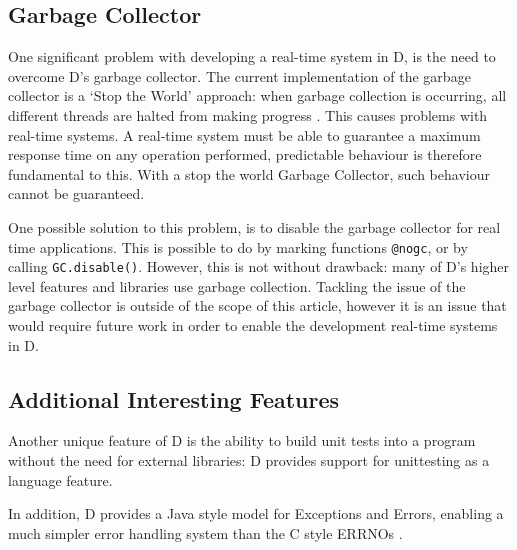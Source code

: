 \subsection{Garbage Collector}
One significant problem with developing a real-time system in D, is the need to 
overcome D's garbage collector. The current implementation of the garbage 
collector is a `Stop the World' approach: when garbage collection is occurring, 
all different threads are halted from making progress 
\cite{http://dlang.org/garbage.html}. This causes problems with 
real-time systems. A real-time system must be able to guarantee a maximum response 
time on any operation performed, predictable behaviour is therefore fundamental to this. 
With a stop the world Garbage Collector, such behaviour cannot be guaranteed. 
\par\bigskip\noindent
One possible solution to this problem, is to disable the garbage collector for 
real time applications. This is possible to do by marking functions \texttt{@nogc}, 
or by calling \texttt{GC.disable()}. However, this is not without drawback: 
many of D's higher level features and libraries use garbage collection. 
Tackling the issue of the garbage collector is outside of the scope of this 
article, however it is an issue that would require future work in order to 
enable the development real-time systems in D. 

\subsection{Additional Interesting Features}
Another unique feature of D is the ability to build unit tests into a 
program without the need for external libraries: D provides support for 
unittesting as a language feature. 
\par\bigskip\noindent
In addition, D provides a Java style model for Exceptions and Errors, enabling 
a much simpler error handling system than the C style ERRNOs 
\cite{http://ddili.org/ders/d.en/exceptions.html}. 
